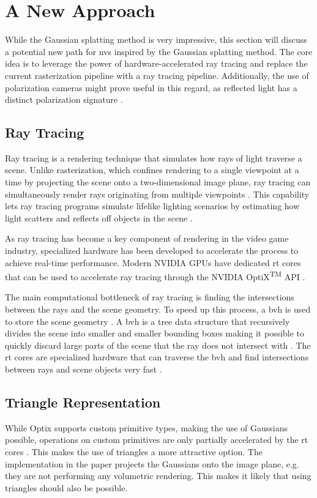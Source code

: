 \section{A New Approach}
While the Gaussian splatting method is very impressive, this section will discuss a potential new path for \gls{nvs} inspired by the Gaussian splatting method.
The core idea is to leverage the power of hardware-accelerated ray tracing and replace the current rasterization pipeline with a ray tracing pipeline.
Additionally, the use of polarization cameras might prove useful in this regard, as reflected light has a distinct polarization signature \cite{lingUniversityPhysicsVolume2016}.

\subsection{Ray Tracing}
Ray tracing is a rendering technique that simulates how rays of light traverse a scene.
Unlike rasterization, which confines rendering to a single viewpoint at a time by projecting the scene onto a two-dimensional image plane, ray tracing can simultaneously render rays originating from multiple viewpoints \cite{caulfieldWhatPathTracing2022}.
This capability lets ray tracing programs simulate lifelike lighting scenarios by estimating how light scatters and reflects off objects in the scene \cite{caulfieldWhatPathTracing2022}.

As ray tracing has become a key component of rendering in the video game industry, specialized hardware has been developed to accelerate the process to achieve real-time performance.
Modern NVIDIA GPUs have dedicated \gls{rt} cores that can be used to accelerate ray tracing through the NVIDIA OptiX\textsuperscript{TM} API \cite{nvidiaNVIDIAOptiXProgramming2023}.

The main computational bottleneck of ray tracing is finding the intersections between the rays and the scene geometry.
To speed up this process, a \gls{bvh} is used to store the scene geometry \cite{nvidiaNVIDIAOptiXProgramming2023}.
A \gls{bvh} is a tree data structure that recursively divides the scene into smaller and smaller bounding boxes making it possible to quickly discard large parts of the scene that the ray does not intersect with \cite{nvidiaNVIDIAOptiXProgramming2023}.
The \gls{rt} cores are specialized hardware that can traverse the \gls{bvh} and find intersections between rays and scene objects very fast \cite{nvidiaNVIDIAOptiXProgramming2023}.


\subsection{Triangle Representation}
While Optix supports custom primitive types, making the use of Gaussians possible, operations on custom primitives are only partially accelerated by the \gls{rt} cores \cite{nvidiaOptiXQuickStart2018}\cite{nvidiaNVIDIAOptiXProgramming2023}.
This makes the use of triangles a more attractive option.
The implementation in the paper projects the Gaussians onto the image plane, e.g. they are not performing any volumetric rendering.
This makes it likely that using triangles should also be possible.

